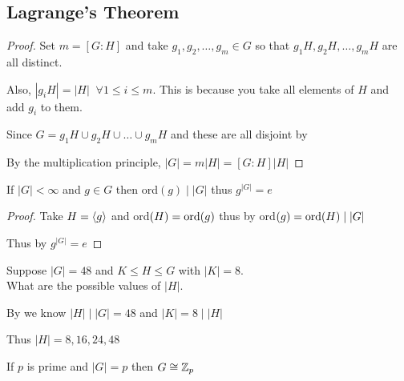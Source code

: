\subsection{Lagrange's Theorem}

\begin{proof}
    Set $m=[G:H]$ and take $g_1,g_2,\ldots,g_m\in G$ so that 
    $g_1H,g_2H,\ldots,g_mH$ are all distinct.
    
    Also, $|g_iH|=|H|\;\; \forall 1\leq i \leq m$. This is because
    you take all elements of $H$ and add $g_i$ to them.
    
    Since $G=g_1H\cup g_2H\cup \ldots\cup g_mH$ and these are all disjoint by 

    By the multiplication principle, $|G|=m|H|=[G:H]|H|$
\end{proof}

\begin{corollary}
    If  $|G|<\infty$ and $g \in G$ then ord$(g)\mid |G|$ thus $g^{|G|}=e$
\end{corollary}

\begin{proof}
    Take $H=\left\langle g \right\rangle$ and ord$(H)=\text{ord}(g)$ thus by  ord$(g)=\text{ord}(H)\mid |G|$

    Thus by  $g^{|G|}=e$
\end{proof}

\begin{example}
    Suppose $|G|=48$ and $K\leq H \leq G$ with $|K|=8$.\\
    What are the possible values of $|H|$.

    By  we know $|H| \mid |G|=48$ and $|K|=8 \mid |H|$

    Thus $|H|=8,16,24,48$
\end{example}

\begin{example}
    
\end{example}

\begin{corollary}
    If $p$ is prime and $|G|=p$ then $G \cong \mathbb{Z}_p$
\end{corollary}

